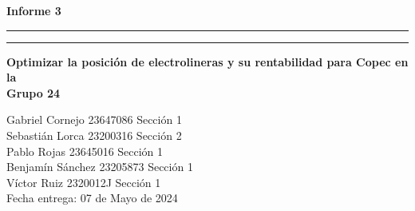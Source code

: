 \documentclass[letterpaper]{article}
\begin{document}
\begin{center}{}
	\vspace*{2mm}
	{\Huge\bf Informe 3}\\
	\vspace*{4mm}
	\hrule\vspace*{1pt}\hrule
	\vspace*{4mm}
	{\LARGE\bf Optimizar la posici\'on de electrolineras y su rentabilidad para Copec en la }\\
	\vspace*{4mm}
	{\huge\bf Grupo 24 }\\
	\vspace*{1mm}
\end{center}

\vspace*{30mm}
\flushright

Gabriel Cornejo 23647086 Sección 1\\
Sebastián Lorca 23200316 Sección 2\\
Pablo Rojas 23645016 Sección 1\\
Benjamín Sánchez  23205873 Sección 1\\
Víctor Ruiz 2320012J Sección 1\\


\vspace*{5mm}
{\large Fecha entrega: 07 de Mayo de 2024\\}

\newpage
\begin{flushleft}
	\tableofcontents
\end{flushleft}
\end{document}
